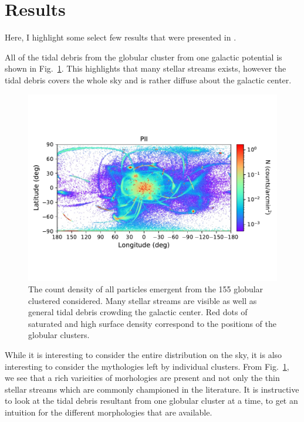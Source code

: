 \section{Results}\label{sec:results}
Here, I highlight some select few results that were presented in \citet{2023A&A...673A..44F}.

All of the tidal debris from the globular cluster from one galactic potential is shown in Fig.~\ref{fig:LB_count_density}. This highlights that many stellar streams exists, however the tidal debris covers the whole sky and is rather diffuse about the galactic center. 


\begin{figure}
    \centering
    \includegraphics[width=\linewidth,trim={0 2cm 0 2cm},clip]{images/LB_count_density.pdf}
    \caption{The count density of all particles emergent from the 155 globular clustered considered. Many stellar streams are visible as well as general tidal debris crowding the galactic center. Red dots of saturated and high surface density correspond to the positions of the globular clusters. }
    \label{fig:LB_count_density}
\end{figure}

While it is interesting to consider the entire distribution on the sky, it is also interesting to consider the mythologies left by individual clusters. From Fig.~\ref{fig:LB_count_density}, we see that a rich varieities of morhologies are present and not only the thin stellar streams which are commonly championed in the literature. It is instructive to look at the tidal debris resultant from one globular cluster at a time, to get an intuition for the different morphologies that are available. 

